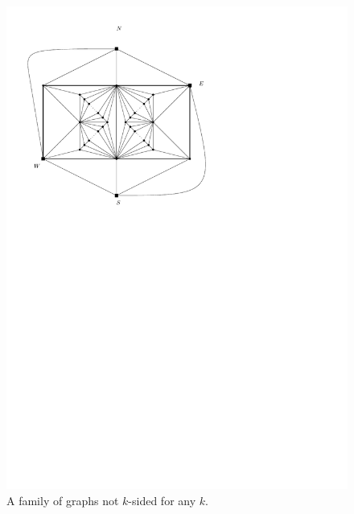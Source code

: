   \begin{figure}[!b]
    \centering
    \includegraphics[scale=.7]{fixExtension/img/manymanybase}
    \caption{A family of graphs not $k$-sided for any $k$.}
    \label{fig:fix:manymany0}
  \end{figure}

